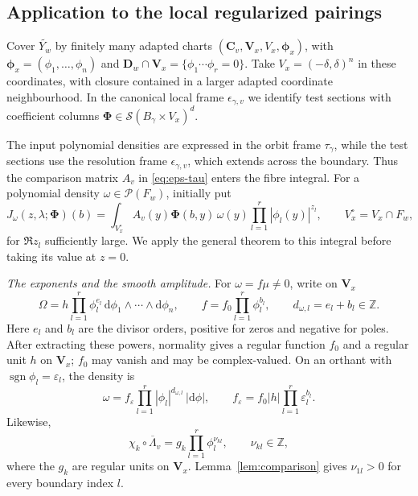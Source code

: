 \documentclass[a4paper,12pt]{amsart}
\numberwithin{equation}{section}
\theoremstyle{definition}
\theoremstyle{remark}
\newcommand{\D}{\mathbf D}
\newcommand{\V}{\mathbf V}
\newcommand{\mcS}{\mathcal S}
\newcommand{\mcP}{\mathcal P}
\newcommand{\dd}{\mathrm d}
\newcommand{\cC}{\mathbf C}
\begin{document}
\subsection{Application to the local regularized pairings}\label{ssec:local-pairing}

Cover $\widetilde{Y_w}$ by finitely many adapted charts $(\cC_v,\V_x,V_x,\boldsymbol\phi_x)$, with $\boldsymbol\phi_x=(\phi_1,\ldots,\phi_n)$ and $\D_w\cap\V_x=\{\phi_1\cdots\phi_r=0\}$. Take $V_x=(-\delta,\delta)^n$ in these coordinates, with closure contained in a larger adapted coordinate neighbourhood. In the canonical local frame $\epsilon_{\gamma,v}$ we identify test sections with coefficient columns $\boldsymbol\Phi\in\mcS(B_\gamma\times V_x)^d$.

The input polynomial densities are expressed in the orbit frame $\tau_\gamma$, while the test sections use the resolution frame $\epsilon_{\gamma,v}$, which extends across the boundary. Thus the comparison matrix $A_v$ in \eqref{eq:eps-tau} enters the fibre integral. For a polynomial density $\omega\in\mcP(F_w)$, initially put
\begin{equation}\label{eq:local-fibre-integral}
 J_\omega(z,\lambda;\boldsymbol\Phi)(b)
 =\int_{V_x^\circ}A_v(y)\boldsymbol\Phi(b,y)\,\omega(y)
        \prod_{l=1}^r|\phi_l(y)|^{z_l},
 \qquad V_x^\circ=V_x\cap F_w,
\end{equation}
for $\Re z_l$ sufficiently large. We apply the general theorem to this integral before taking its value at $z=0$.

\emph{The exponents and the smooth amplitude.}
For $\omega=f\mu\ne0$, write on $\V_x$
\begin{equation}\label{eq:omega-decomp}
 \Omega=h\prod_{l=1}^r\phi_l^{e_l}\,\dd\phi_1\wedge\cdots\wedge\dd\phi_n,
 \qquad f=f_0\prod_{l=1}^r\phi_l^{b_l},
 \qquad d_{\omega,l}=e_l+b_l\in\mathbb Z.
\end{equation}
Here $e_l$ and $b_l$ are the divisor orders, positive for zeros and negative for poles. After extracting these powers, normality gives a regular function $f_0$ and a regular unit $h$ on $\V_x$; $f_0$ may vanish and may be complex-valued. On an orthant with $\operatorname{sgn}\phi_l=\varepsilon_l$, the density is
\[
 \omega=f_\varepsilon\prod_{l=1}^r|\phi_l|^{d_{\omega,l}}\,|\dd\phi|,
 \qquad f_\varepsilon=f_0|h|\prod_{l=1}^r\varepsilon_l^{b_l}.
\]
Likewise,
\begin{equation}\label{eq:nu-kl}
 \chi_k\circ\overline\Lambda_v=g_k\prod_{l=1}^r\phi_l^{\nu_{kl}},
 \qquad \nu_{kl}\in\mathbb Z,
\end{equation}
where the $g_k$ are regular units on $\V_x$. Lemma~\ref{lem:comparison} gives $\nu_{1l}>0$ for every boundary index $l$.
\end{document}
